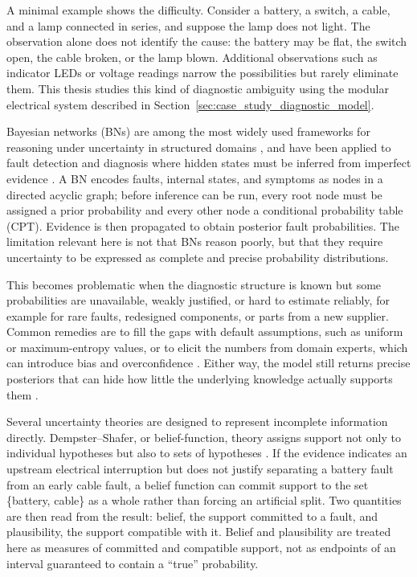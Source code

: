 \documentclass[runningheads]{llncs}
\begin{document}
A minimal example shows the difficulty. Consider a battery, a switch, a cable, and a lamp connected in series, and suppose the lamp does not light. The observation alone does not identify the cause: the battery may be flat, the switch open, the cable broken, or the lamp blown. Additional observations such as indicator LEDs or voltage readings narrow the possibilities but rarely eliminate them. This thesis studies this kind of diagnostic ambiguity using the modular electrical system described in Section~\ref{sec:case_study_diagnostic_model}.

Bayesian networks (BNs) are among the most widely used frameworks for reasoning under uncertainty in structured domains \cite{Pearl1988,Heckerman1995}, and have been applied to fault detection and diagnosis where hidden states must be inferred from imperfect evidence \cite{LernerParrKollerBiswas2000}. A BN encodes faults, internal states, and symptoms as nodes in a directed acyclic graph; before inference can be run, every root node must be assigned a prior probability and every other node a conditional probability table (CPT). Evidence is then propagated to obtain posterior fault probabilities. The limitation relevant here is not that BNs reason poorly, but that they require uncertainty to be expressed as complete and precise probability distributions.

This becomes problematic when the diagnostic structure is known but some probabilities are unavailable, weakly justified, or hard to estimate reliably, for example for rare faults, redesigned components, or parts from a new supplier. Common remedies are to fill the gaps with default assumptions, such as uniform or maximum-entropy values, or to elicit the numbers from domain experts, which can introduce bias and overconfidence \cite{OHagan2006}. Either way, the model still returns precise posteriors that can hide how little the underlying knowledge actually supports them \cite{Shenoy2023IncompleteBN}.

Several uncertainty theories are designed to represent incomplete information directly. Dempster--Shafer, or belief-function, theory assigns support not only to individual hypotheses but also to sets of hypotheses \cite{Dempster1967,Shafer1976}. If the evidence indicates an upstream electrical interruption but does not justify separating a battery fault from an early cable fault, a belief function can commit support to the set \{battery, cable\} as a whole rather than forcing an artificial split. Two quantities are then read from the result: belief, the support committed to a fault, and plausibility, the support compatible with it. Belief and plausibility are treated here as measures of committed and compatible support, not as endpoints of an interval guaranteed to contain a ``true'' probability.
\end{document}
